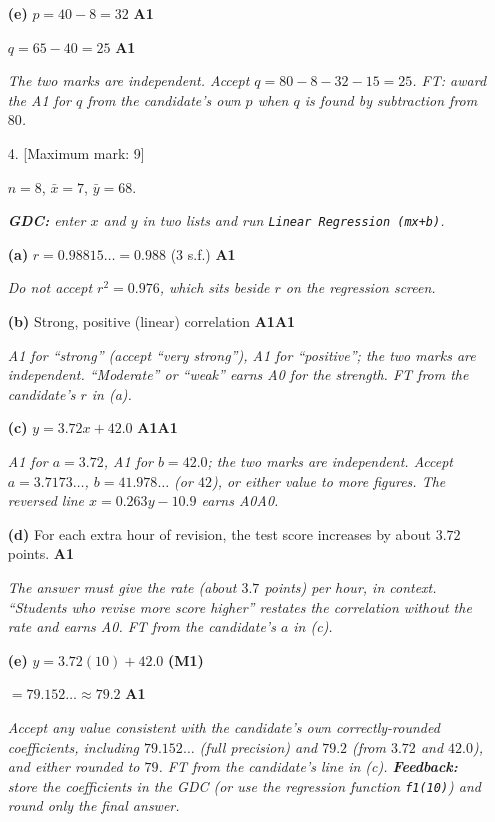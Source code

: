 \documentclass[12pt, twoside]{article}
\begin{document}
\begin{enumerate}[itemsep=0.3cm]
\textbf{(e)} $p = 40 - 8 = 32$ \hfill \textbf{A1}

$q = 65 - 40 = 25$ \hfill \textbf{A1}

\emph{The two marks are independent. Accept $q = 80 - 8 - 32 - 15 = 25$.
FT: award the A1 for $q$ from the candidate's own $p$ when $q$ is found by
subtraction from $80$.}

\newpage

\item[4.] [Maximum mark: 9]

$n = 8$, \quad $\bar{x} = 7$, \quad $\bar{y} = 68$.

\emph{\textbf{GDC:} enter $x$ and $y$ in two lists and run
\texttt{Linear Regression (mx+b)}.}

\textbf{(a)} $r = 0.98815\ldots = 0.988$ (3 s.f.) \hfill \textbf{A1}

\emph{Do not accept $r^{2} = 0.976$, which sits beside $r$ on the
regression screen.}

\textbf{(b)} Strong, positive (linear) correlation \hfill \textbf{A1A1}

\emph{A1 for ``strong'' (accept ``very strong''), A1 for ``positive''; the two
marks are independent. ``Moderate'' or ``weak'' earns A0 for the strength.
FT from the candidate's $r$ in (a).}

\textbf{(c)} $y = 3.72x + 42.0$ \hfill \textbf{A1A1}

\emph{A1 for $a = 3.72$, A1 for $b = 42.0$; the two marks are independent.
Accept $a = 3.7173\ldots$, $b = 41.978\ldots$ (or $42$), or either value to
more figures. The reversed line $x = 0.263y - 10.9$ earns A0A0.}

\textbf{(d)} For each extra hour of revision, the test score increases by
about $3.72$ points. \hfill \textbf{A1}

\emph{The answer must give the rate (about $3.7$ points) per hour, in
context. ``Students who revise more score higher'' restates the correlation
without the rate and earns A0. FT from the candidate's $a$ in (c).}

\textbf{(e)} $y = 3.72(10) + 42.0$ \hfill \textbf{(M1)}

$= 79.152\ldots \approx 79.2$ \hfill \textbf{A1}

\emph{Accept any value consistent with the candidate's own correctly-rounded
coefficients, including $79.152\ldots$ (full precision) and $79.2$ (from
$3.72$ and $42.0$), and either rounded to $79$. FT from the candidate's
line in (c). \textbf{Feedback:} store the coefficients in the GDC (or use the
regression function \texttt{f1(10)}) and round only the final answer.}


\end{enumerate}
\end{document}
